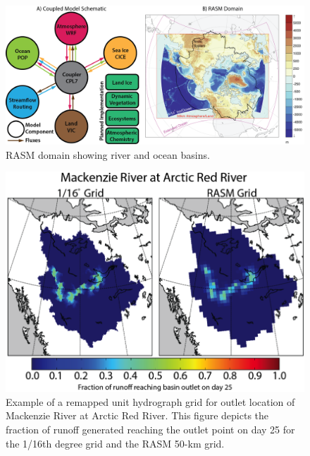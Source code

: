 \documentclass[jgrga, draft]{agutex}
\begin{document}
%
%
%
%
\clearpage
\begin{figure}
\noindent\includegraphics[width=40pc,natwidth=1]{Figure_1}
\caption{RASM domain showing river and ocean basins.}
\label{fig:1}
\end{figure}

\clearpage
\begin{figure}
\noindent\includegraphics[width=40pc,natwidth=1]{Figure_2}
\caption{Example of a remapped unit hydrograph grid for outlet location of Mackenzie River at Arctic Red River. This figure depicts the fraction of runoff generated reaching the outlet point on day 25 for the 1/16th degree grid and the RASM 50-km grid.}
\label{fig:2}
\end{figure}
\end{document}
